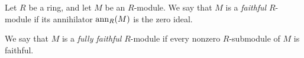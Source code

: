 \documentclass{article}
\begin{document}
Let $R$ be a ring, and let $M$ be an $R$-module.  
We say that $M$ is a {\it faithful} $R$-module 
if its annihilator ${\rm ann}_R(M)$ is the zero ideal.

We say that $M$ is a {\it fully faithful} $R$-module
if every nonzero $R$-submodule of $M$ is faithful.
\end{document}

